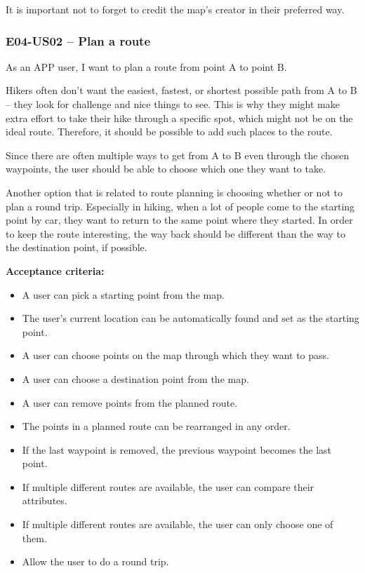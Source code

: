 It is important not to forget to credit the map's creator in their preferred way.

\subsubsection*{E04-US02 -- Plan a route}
As an APP user, I want to plan a route from point A to point B.

Hikers often don't want the easiest, fastest, or shortest possible path from A to B -- they look for challenge and nice things to see.
This is why they might make extra effort to take their hike through a specific spot, which might not be on the ideal route.
Therefore, it should be possible to add such places to the route.

Since there are often multiple ways to get from A to B even through the chosen waypoints, the user should be able to choose which one they want to take.

Another option that is related to route planning is choosing whether or not to plan a round trip.
Especially in hiking, when a lot of people come to the starting point by car, they want to return to the same point where they started.
In order to keep the route interesting, the way back should be different than the way to the destination point, if possible.

\textbf{Acceptance criteria:}
\begin{itemize}
    \item A user can pick a starting point from the map.
    \item The user's current location can be automatically found and set as the starting point.
    \item A user can choose points on the map through which they want to pass.
    \item A user can choose a destination point from the map.
    \item A user can remove points from the planned route.
    \item The points in a planned route can be rearranged in any order.
    \item If the last waypoint is removed, the previous waypoint becomes the last point.
    \item If multiple different routes are available, the user can compare their attributes.
    \item If multiple different routes are available, the user can only choose one of them.
    \item Allow the user to do a round trip.
\end{itemize}

